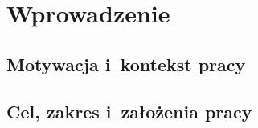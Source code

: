 \chapter{Wprowadzenie}
\label{ch:wprowadzenie}

\section{Motywacja i~kontekst pracy}
\label{sec:motywacja}


\section{Cel, zakres i~założenia pracy}
\label{sec:cel-zakres}


